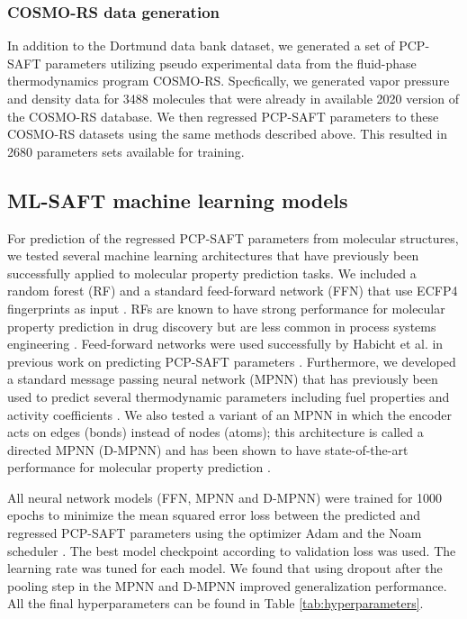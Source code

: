 \subsubsection{COSMO-RS data generation}

In addition to the Dortmund data bank dataset, we generated a set of PCP-SAFT parameters utilizing pseudo experimental data from the fluid-phase thermodynamics program COSMO-RS.\cite{Klamt2010} Specfically, we generated vapor pressure and density data for 3488 molecules that were already in available 2020 version of the COSMO-RS database. We then regressed PCP-SAFT parameters to these COSMO-RS datasets using the same methods described above. This resulted in 2680 parameters sets available for training.

\subsection{ML-SAFT machine learning models}\label{subsec:ML-SAFT_model}

For prediction of the regressed PCP-SAFT parameters from molecular structures, we tested several machine learning architectures that have previously been successfully applied to molecular property prediction tasks. We included a random forest (RF)\cite{Breiman2001} and a standard feed-forward network (FFN) that use ECFP4 fingerprints as input \cite{Rogers2010}. RFs are known to have strong performance for molecular property prediction in drug discovery but are less common in process systems engineering \cite{Ramsundar2017, Yang2019}. Feed-forward networks were used successfully by Habicht et al. in previous work on predicting PCP-SAFT parameters \cite{Habicht2023}. Furthermore, we developed a standard message passing neural network (MPNN) \cite{Gilmer2017} that has previously been used to predict several thermodynamic parameters including fuel properties\cite{Schweidtmann2020} and activity coefficients \cite{SanchezMedina2022, Rittig2023}. We also tested a variant of an MPNN in which the encoder acts on edges (bonds) instead of nodes (atoms); this architecture is called a directed MPNN (D-MPNN) and has been shown to have state-of-the-art performance for molecular property prediction \cite{Yang2019, Vermeire2021}.

All neural network models (FFN, MPNN and D-MPNN) were trained for 1000 epochs to minimize the mean squared error loss between the predicted and regressed PCP-SAFT parameters using the optimizer Adam\cite{Kingma2015} and the Noam scheduler \cite{Vaswani2017}. The best model checkpoint according to validation loss was used. The learning rate was tuned for each model. We found that using dropout after the pooling step in the MPNN and D-MPNN improved generalization performance. All the final hyperparameters can be found in Table \ref{tab:hyperparameters}.

